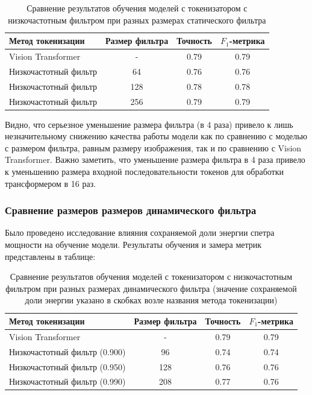 \documentclass[times,specification,annotation]{itmo-student-thesis}
\begin{document}
\begin{table}[H]
  \centering
  \caption{Сравнение результатов обучения моделей с токенизатором с низкочастотным фильтром при разных размерах статического фильтра}
  \label{tab:fft-tokenization-static}
  \begin{tabular}{|l|c|c|c|}
    \hline
    Метод токенизации & Размер фильтра & Точность & $F_1$-метрика \\ \hline
    Vision Transformer & - & 0.79 & 0.79 \\
    Низкочастотный фильтр & 64 & 0.76 & 0.76 \\
    Низкочастотный фильтр & 128 & 0.78 & 0.78 \\
    Низкочастотный фильтр & 256 & 0.79 & 0.79 \\
    \hline
  \end{tabular}
\end{table}

Видно, что серьезное уменьшение размера фильтра (в 4 раза) привело к лишь незначительному снижению качества работы модели как по сравнению с моделью с размером фильтра, равным размеру изображения, так и по сравнению с Vision Transformer. Важно заметить, что уменьшение размера фильтра в 4 раза привело к уменьшению размера входной последовательности токенов для обработки трансформером в 16 раз. 

\subsubsection{Сравнение размеров размеров динамического фильтра}

Было проведено исследование влияния сохраняемой доли энергии спетра мощности на обучение модели. Результаты обучения и замера метрик представлены в таблице:

\begin{table}[H]
  \centering
  \caption{Сравнение результатов обучения моделей с токенизатором с низкочастотным фильтром при разных размерах динамического фильтра (значение сохраняемой доли энергии указано в скобках возле названия метода токенизации)}
  \label{tab:fft-tokenization-dynamic}
  \begin{tabular}{|l|c|c|c|}
    \hline
    Метод токенизации & Размер фильтра & Точность & $F_1$-метрика \\ \hline
    Vision Transformer & - & 0.79 & 0.79 \\
    Низкочастотный фильтр (0.900) & 96 & 0.74 & 0.74 \\
    Низкочастотный фильтр (0.950) & 128 & 0.76 & 0.76 \\
    Низкочастотный фильтр (0.990) & 208 & 0.77 & 0.76 \\
    \hline
  \end{tabular}
\end{table}
\end{document}
